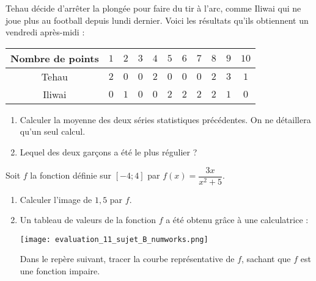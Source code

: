 \documentclass[a4paper,dvipsnames]{article}
\begin{document}
\bigskip

\exo[4 points] Tehau décide d'arrêter la plongée pour faire du tir à l'arc, comme Iliwai qui ne joue plus au football depuis lundi dernier. Voici les résultats qu'ils obtiennent un vendredi après-midi :

\begin{center}
  \begin{tabular}{@{}ccccccccccc@{}}
    \toprule
    Nombre de points & $1$ & $2$ & $3$ & $4$ & $5$ & $6$ & $7$ & $8$ & $9$ & $10$\\
    \midrule
    Tehau & $2$ & $0$ & $0$ & $2$ & $0$ & $0$ & $0$ & $2$ & $3$ & $1$\\
    Iliwai & $0$ & $1$ & $0$ & $0$ & $2$ & $2$ & $2$ & $2$ & $1$ & $0$\\
    \bottomrule
  \end{tabular}

  \smallskip

  \begin{enumerate}
    \item Calculer la moyenne des deux séries statistiques précédentes. On ne détaillera qu'un seul calcul.
    \item Lequel des deux garçons a été le plus régulier ?
  \end{enumerate}
\end{center}

\bigskip

\exo[4 points] Soit $f$ la fonction définie sur $[-4;4]$ par $f(x)=\dfrac{3x}{x^2+5}$.

\begin{enumerate}
  \item Calculer l'image de $1,5$ par $f$.
  \item Un tableau de valeurs de la fonction $f$ a été obtenu grâce à une calculatrice :
    \begin{center}
      \texttt{[image: evaluation\_11\_sujet\_B\_numworks.png]}    
    \end{center}
    Dans le repère suivant, tracer la courbe représentative de $f$, sachant que $f$ est une fonction impaire.
\end{enumerate}
\end{document}
